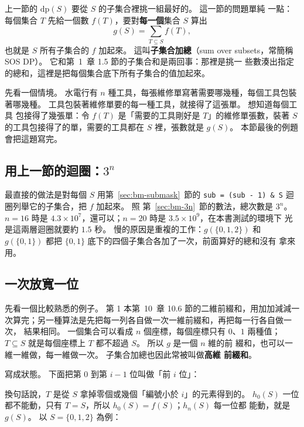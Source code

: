 上一節的 $\mathrm{dp}(S)$ 要從 $S$ 的子集合裡挑一組最好的。 這一節的問題單純
一點：每個集合 $T$ 先給一個數 $f(T)$，要對\textbf{每一個}集合 $S$ 算出
\[
g(S) = \sum_{T \subseteq S} f(T),
\]
也就是 $S$ 所有子集合的 $f$ 加起來。 這叫\textbf{子集合加總}（sum over
subsets，常簡稱 SOS DP）。 它和第~1~章 1.5 節的子集合和是兩回事：那裡是挑一
些數湊出指定的總和，這裡是把每個集合底下所有子集合的值加起來。

先看一個情境。 水電行有 $n$ 種工具，每張維修單寫著需要哪幾種，每個工具包裝
著哪幾種。 工具包裝著維修單要的每一種工具，就接得了這張單。 想知道每個工具
包接得了幾張單：令 $f(T)$ 是「需要的工具剛好是 $T$」的維修單張數，裝著 $S$
的工具包接得了的單，需要的工具都在 $S$ 裡，張數就是 $g(S)$。 本節最後的例題
會把這題寫完。

\subsection{\texorpdfstring{用上一節的迴圈：$3^n$}{用上一節的迴圈：3ⁿ}}

最直接的做法是對每個 $S$ 用第~\ref{sec:bm-submask}~節的
\texttt{sub = (sub - 1) \& S} 迴圈列舉它的子集合，把 $f$ 加起來。 照
第~\ref{sec:bm-3n}~節的數法，總次數是 $3^n$。 $n = 16$ 時是
$4.3 \times 10^7$，還可以；$n = 20$ 時是 $3.5 \times 10^9$，在本書測試的環境下
光是這兩層迴圈就要約 $1.5$ 秒。 慢的原因是重複的工作：$g(\{0, 1, 2\})$ 和
$g(\{0, 1\})$ 都把 $\{0, 1\}$ 底下的四個子集合各加了一次，前面算好的總和沒有
拿來用。

\subsection{一次放寬一位}
\label{sec:bm-sos-bits}

先看一個比較熟悉的例子。 第 1 本第~10~章 10.6 節的二維前綴和，用加加減減一
次算完；另一種算法是先把每一列各自做一次一維前綴和，再把每一行各自做一次，
結果相同。 一個集合可以看成 $n$ 個座標，每個座標只有 $0$、$1$ 兩種值；
$T \subseteq S$ 就是每個座標上 $T$ 都不超過 $S$。 所以 $g$ 是一個 $n$ 維的前
綴和，也可以一維一維做，每一維做一次。 子集合加總也因此常被叫做\textbf{高維
前綴和}。

寫成狀態。 下面把第 $0$ 到第 $i - 1$ 位叫做「前 $i$ 位」：

\begin{center}
\end{center}

換句話說，$T$ 是從 $S$ 拿掉零個或幾個「編號小於 $i$」的元素得到的。
$h_0(S)$ 一位都不能動，只有 $T = S$，所以 $h_0(S) = f(S)$；$h_n(S)$ 每一位都
能動，就是 $g(S)$。 以 $S = \{0, 1, 2\}$ 為例：


